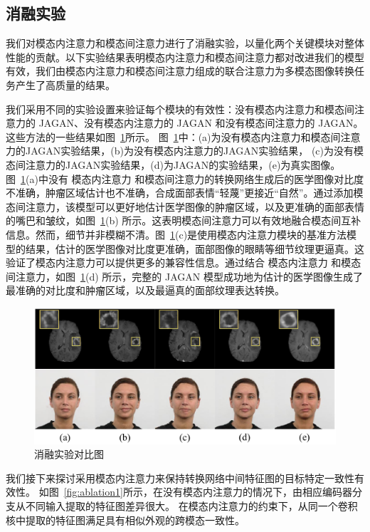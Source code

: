 \subsection{消融实验}

我们对模态内注意力和模态间注意力进行了消融实验，以量化两个关键模块对整体性能的贡献。以下实验结果表明模态内注意力和模态间注意力都对改进我们的模型有效，我们由模态内注意力和模态间注意力组成的联合注意力为多模态图像转换任务产生了高质量的结果。

我们采用不同的实验设置来验证每个模块的有效性：没有模态内注意力和模态间注意力的 JAGAN、没有模态内注意力的 JAGAN 和没有模态间注意力的 JAGAN。这些方法的一些结果如图~\ref{fig:ablation}所示。
图~\ref{fig:ablation}中：(a)为没有模态内注意力和模态间注意力的JAGAN实验结果，(b)为没有模态内注意力的JAGAN实验结果， (c)为没有模态间注意力的JAGAN实验结果，(d)为JAGAN的实验结果，(e)为真实图像。
图~\ref{fig:ablation}(a)中没有 模态内注意力 和模态间注意力的转换网络生成后的医学图像对比度不准确，肿瘤区域估计也不准确，合成面部表情“轻蔑”更接近“自然”。通过添加模态间注意力，该模型可以更好地估计医学图像的肿瘤区域，以及更准确的面部表情的嘴巴和皱纹，如图~\ref{fig:ablation}(b) 所示。这表明模态间注意力可以有效地融合模态间互补信息。然而，细节并非模糊不清。图~\ref{fig:ablation}(c)是使用模态内注意力模块的基准方法模型的结果，估计的医学图像对比度更准确，面部图像的眼睛等细节纹理更逼真。这验证了模态内注意力可以提供更多的兼容性信息。通过结合 模态内注意力 和模态间注意力，如图~\ref{fig:ablation}(d) 所示，完整的 JAGAN 模型成功地为估计的医学图像生成了最准确的对比度和肿瘤区域，以及最逼真的面部纹理表达转换。

\begin{figure}
	\begin{center}
		\includegraphics[width=0.8\columnwidth]{figures/JAGAN/ablation.pdf}
	\end{center}
	\caption{消融实验对比图}
	\label{fig:ablation}
\end{figure}

我们接下来探讨采用模态内注意力来保持转换网络中间特征图的目标特定一致性有效性。 如图~\ref{fig:ablation1}所示，在没有模态内注意力的情况下，由相应编码器分支从不同输入提取的特征图差异很大。 在模态内注意力的约束下，从同一个卷积核中提取的特征图满足具有相似外观的跨模态一致性。

